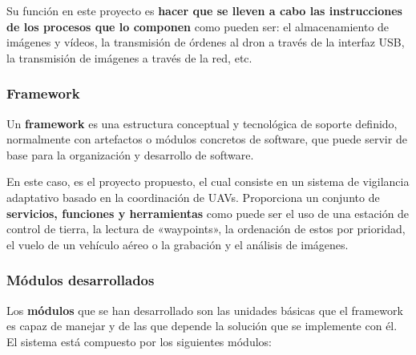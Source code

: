Su función en este proyecto es \textbf{hacer que se lleven a cabo las instrucciones de los procesos que lo componen} como pueden ser: el almacenamiento de imágenes y vídeos, la transmisión de órdenes al dron a través de la interfaz USB, la transmisión de imágenes a través de la red, etc.

\subsubsection{Framework}
\label{sec:framework}

Un \textbf{framework} es una estructura conceptual y tecnológica de soporte definido, normalmente con artefactos o módulos concretos de software, que puede servir de base para la organización y desarrollo de software.

En este caso, es el proyecto propuesto, el cual consiste en un sistema de vigilancia adaptativo basado en la coordinación de \acs{UAV}s. Proporciona un conjunto de \textbf{servicios, funciones y herramientas} como puede ser el uso de una estación de control de tierra, la lectura de «waypoints», la ordenación de estos por prioridad, el vuelo de un vehículo aéreo o la grabación y el análisis de imágenes.

\subsubsection{Módulos desarrollados}
\label{sec:modulos}

Los \textbf{módulos} que se han desarrollado son las unidades básicas que el framework es capaz de manejar y de las que depende la solución que se implemente con él. El sistema está compuesto por los siguientes módulos:

